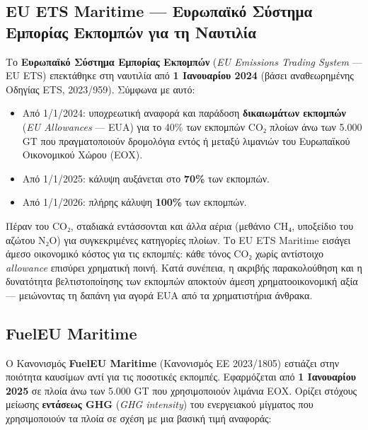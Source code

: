 \subsection{EU ETS Maritime --- Ευρωπαϊκό Σύστημα Εμπορίας Εκπομπών για
τη
Ναυτιλία}\label{eu-ets-maritime-ux3b5ux3c5ux3c1ux3c9ux3c0ux3b1ux3caux3baux3cc-ux3c3ux3cdux3c3ux3c4ux3b7ux3bcux3b1-ux3b5ux3bcux3c0ux3bfux3c1ux3afux3b1ux3c2-ux3b5ux3baux3c0ux3bfux3bcux3c0ux3ceux3bd-ux3b3ux3b9ux3b1-ux3c4ux3b7-ux3bdux3b1ux3c5ux3c4ux3b9ux3bbux3afux3b1}

Το \textbf{Ευρωπαϊκό Σύστημα Εμπορίας Εκπομπών} (\emph{EU Emissions
Trading System} --- EU ETS) επεκτάθηκε στη ναυτιλία από \textbf{1
Ιανουαρίου 2024} (βάσει αναθεωρημένης Οδηγίας ETS, 2023/959). Σύμφωνα με
αυτό:

\begin{itemize}
\tightlist
\item
  Από 1/1/2024: υποχρεωτική αναφορά και παράδοση \textbf{δικαιωμάτων
  εκπομπών} (\emph{EU Allowances} --- EUA) για το 40\% των εκπομπών CO₂
  πλοίων άνω των 5.000 GT που πραγματοποιούν δρομολόγια εντός ή μεταξύ
  λιμανιών του Ευρωπαϊκού Οικονομικού Χώρου (ΕΟΧ).
\item
  Από 1/1/2025: κάλυψη αυξάνεται στο \textbf{70\%} των εκπομπών.
\item
  Από 1/1/2026: πλήρης κάλυψη \textbf{100\%} των εκπομπών.
\end{itemize}

Πέραν του CO₂, σταδιακά εντάσσονται και άλλα αέρια (μεθάνιο CH₄,
υποξείδιο του αζώτου N₂O) για συγκεκριμένες κατηγορίες πλοίων. Το EU ETS
Maritime εισάγει άμεσο οικονομικό κόστος για τις εκπομπές: κάθε τόνος
CO₂ χωρίς αντίστοιχο \emph{allowance} επισύρει χρηματική ποινή. Κατά
συνέπεια, η ακριβής παρακολούθηση και η δυνατότητα βελτιστοποίησης των
εκπομπών αποκτούν άμεση χρηματοοικονομική αξία --- μειώνοντας τη δαπάνη
για αγορά EUA από τα χρηματιστήρια άνθρακα.

\subsection{FuelEU Maritime}\label{fueleu-maritime}

Ο Κανονισμός \textbf{FuelEU Maritime} (Κανονισμός ΕΕ 2023/1805) εστιάζει
στην ποιότητα καυσίμων αντί για τις ποσοτικές εκπομπές. Εφαρμόζεται από
\textbf{1 Ιανουαρίου 2025} σε πλοία άνω των 5.000 GT που χρησιμοποιούν
λιμάνια ΕΟΧ. Ορίζει στόχους μείωσης \textbf{εντάσεως GHG} (\emph{GHG
intensity}) του ενεργειακού μίγματος που χρησιμοποιούν τα πλοία σε σχέση
με μια βασική τιμή αναφοράς:

